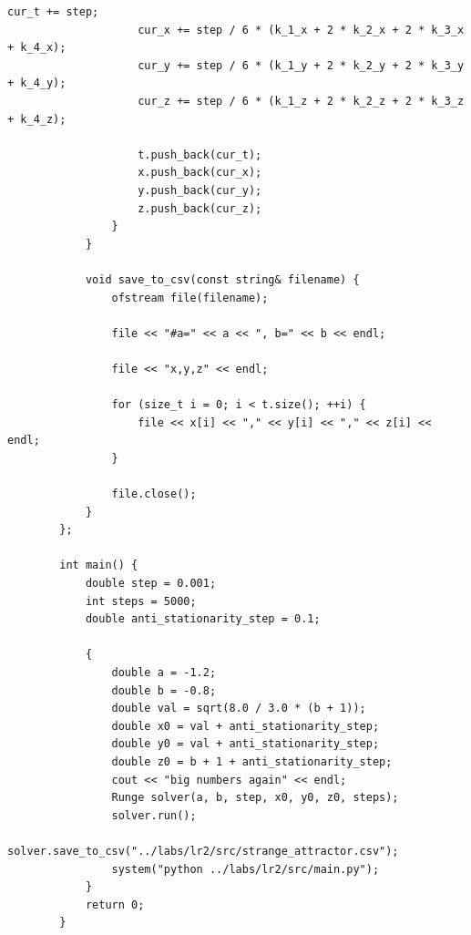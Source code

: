 \documentclass[14pt,a4paper]{extarticle}
\theoremstyle{plain}
\begin{document}
\begin{lstlisting}[title=main.cpp, gobble=16, breaklines=true, breakatwhitespace=true]
					cur_t += step;
					cur_x += step / 6 * (k_1_x + 2 * k_2_x + 2 * k_3_x + k_4_x);
					cur_y += step / 6 * (k_1_y + 2 * k_2_y + 2 * k_3_y + k_4_y);
					cur_z += step / 6 * (k_1_z + 2 * k_2_z + 2 * k_3_z + k_4_z);
					
					t.push_back(cur_t);
					x.push_back(cur_x);
					y.push_back(cur_y);
					z.push_back(cur_z);
				}
			}
			
			void save_to_csv(const string& filename) {
				ofstream file(filename);
				
				file << "#a=" << a << ", b=" << b << endl;
				
				file << "x,y,z" << endl;
				
				for (size_t i = 0; i < t.size(); ++i) {
					file << x[i] << "," << y[i] << "," << z[i] << endl;
				}
				
				file.close();
			}
		};
		
		int main() {
			double step = 0.001;
			int steps = 5000;
			double anti_stationarity_step = 0.1;
			
			{
				double a = -1.2;
				double b = -0.8;
				double val = sqrt(8.0 / 3.0 * (b + 1));
				double x0 = val + anti_stationarity_step;
				double y0 = val + anti_stationarity_step;
				double z0 = b + 1 + anti_stationarity_step;
				cout << "big numbers again" << endl;
				Runge solver(a, b, step, x0, y0, z0, steps);
				solver.run();
				solver.save_to_csv("../labs/lr2/src/strange_attractor.csv");
				system("python ../labs/lr2/src/main.py");
			}
			return 0;
		}
	\end{lstlisting}
	
\end{document}
